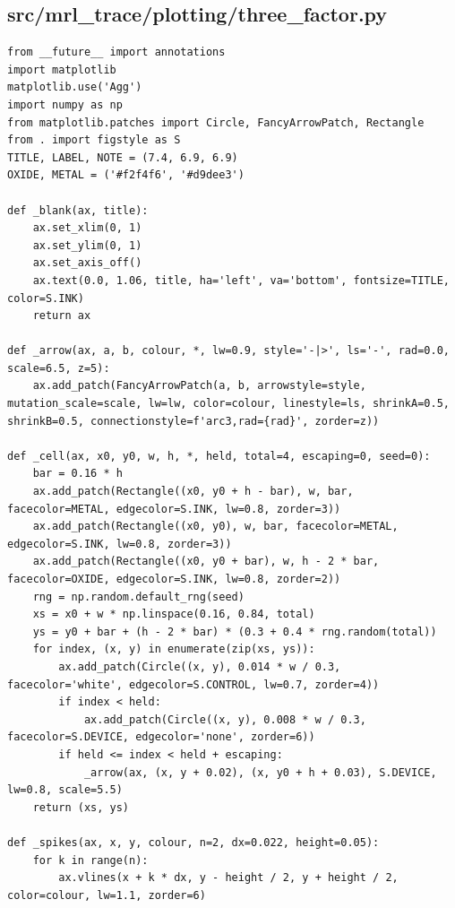 \documentclass[a4paper,10pt]{article}
\begin{document}
\subsection{src/mrl\_trace/plotting/three\_factor.py}
\begin{Verbatim}
from __future__ import annotations
import matplotlib
matplotlib.use('Agg')
import numpy as np
from matplotlib.patches import Circle, FancyArrowPatch, Rectangle
from . import figstyle as S
TITLE, LABEL, NOTE = (7.4, 6.9, 6.9)
OXIDE, METAL = ('#f2f4f6', '#d9dee3')

def _blank(ax, title):
    ax.set_xlim(0, 1)
    ax.set_ylim(0, 1)
    ax.set_axis_off()
    ax.text(0.0, 1.06, title, ha='left', va='bottom', fontsize=TITLE, color=S.INK)
    return ax

def _arrow(ax, a, b, colour, *, lw=0.9, style='-|>', ls='-', rad=0.0, scale=6.5, z=5):
    ax.add_patch(FancyArrowPatch(a, b, arrowstyle=style, mutation_scale=scale, lw=lw, color=colour, linestyle=ls, shrinkA=0.5, shrinkB=0.5, connectionstyle=f'arc3,rad={rad}', zorder=z))

def _cell(ax, x0, y0, w, h, *, held, total=4, escaping=0, seed=0):
    bar = 0.16 * h
    ax.add_patch(Rectangle((x0, y0 + h - bar), w, bar, facecolor=METAL, edgecolor=S.INK, lw=0.8, zorder=3))
    ax.add_patch(Rectangle((x0, y0), w, bar, facecolor=METAL, edgecolor=S.INK, lw=0.8, zorder=3))
    ax.add_patch(Rectangle((x0, y0 + bar), w, h - 2 * bar, facecolor=OXIDE, edgecolor=S.INK, lw=0.8, zorder=2))
    rng = np.random.default_rng(seed)
    xs = x0 + w * np.linspace(0.16, 0.84, total)
    ys = y0 + bar + (h - 2 * bar) * (0.3 + 0.4 * rng.random(total))
    for index, (x, y) in enumerate(zip(xs, ys)):
        ax.add_patch(Circle((x, y), 0.014 * w / 0.3, facecolor='white', edgecolor=S.CONTROL, lw=0.7, zorder=4))
        if index < held:
            ax.add_patch(Circle((x, y), 0.008 * w / 0.3, facecolor=S.DEVICE, edgecolor='none', zorder=6))
        if held <= index < held + escaping:
            _arrow(ax, (x, y + 0.02), (x, y0 + h + 0.03), S.DEVICE, lw=0.8, scale=5.5)
    return (xs, ys)

def _spikes(ax, x, y, colour, n=2, dx=0.022, height=0.05):
    for k in range(n):
        ax.vlines(x + k * dx, y - height / 2, y + height / 2, color=colour, lw=1.1, zorder=6)


\end{Verbatim}
\end{document}
